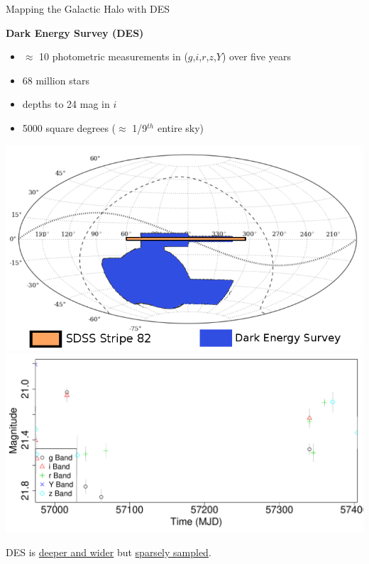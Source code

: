\documentclass[12pt]{beamer}
\begin{document}
\begin{frame}{Mapping the Galactic Halo with DES}

\textbf{Dark Energy Survey (DES)}
\begin{itemize}
\item $\approx$ 10 photometric measurements in ($g$,$i$,$r$,$z$,$Y$) over five years
\item 68 million stars
\item depths to 24 mag in $i$
\item 5000 square degrees ($\approx$ 1/9$^{th}$ entire sky)
\end{itemize}

\vspace{.1in}
\includegraphics[scale=0.2]{figs/des_observing_strategy.png}
\includegraphics[scale=0.2]{figs/unfolded_des_2.pdf}

\vspace{.1in}

\begin{center}
  DES is \underline{deeper and wider} but \underline{sparsely sampled}.
\end{center}

\end{frame}
\end{document}
